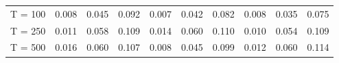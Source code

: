 % 
\begin{tabular}{cccccccccc}
  \hline
  \hline
T = 100 & 0.008 & 0.045 & 0.092 & 0.007 & 0.042 & 0.082 & 0.008 & 0.035 & 0.075 \\ 
  T = 250 & 0.011 & 0.058 & 0.109 & 0.014 & 0.060 & 0.110 & 0.010 & 0.054 & 0.109 \\ 
  T = 500 & 0.016 & 0.060 & 0.107 & 0.008 & 0.045 & 0.099 & 0.012 & 0.060 & 0.114 \\ 
   \hline
\end{tabular}
